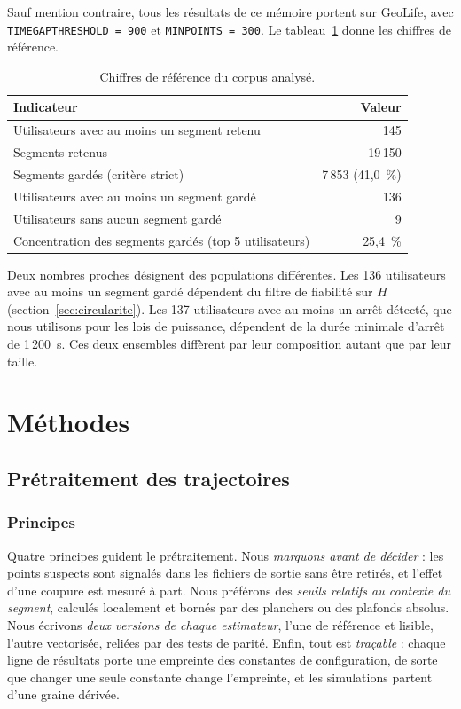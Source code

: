 \documentclass[11pt,a4paper]{article}
\newcommand{\code}[1]{\texttt{#1}}
\renewcommand{\_}{\textunderscore\penalty0\hspace{0pt}}
\begin{document}
Sauf mention contraire, tous les résultats de ce mémoire portent sur GeoLife, avec
\code{TIME\_GAP\_THRESHOLD = 900} et \code{MIN\_POINTS = 300}. Le
tableau~\ref{tab:corpus} donne les chiffres de référence.

\begin{table}[ht]
\centering
\caption{Chiffres de référence du corpus analysé.}
\label{tab:corpus}
\small
\begin{tabular}{lr}
\toprule
Indicateur & Valeur \\
\midrule
Utilisateurs avec au moins un segment retenu & 145 \\
Segments retenus & 19\,150 \\
Segments gardés (critère strict) & 7\,853 (41,0~\%) \\
Utilisateurs avec au moins un segment gardé & 136 \\
Utilisateurs sans aucun segment gardé & 9 \\
Concentration des segments gardés (top 5 utilisateurs) & 25,4~\% \\
\bottomrule
\end{tabular}
\end{table}

Deux nombres proches désignent des populations différentes. Les 136 utilisateurs avec au
moins un segment gardé dépendent du filtre de fiabilité sur $H$
(section~\ref{sec:circularite}). Les 137 utilisateurs avec au moins un arrêt détecté, que
nous utilisons pour les lois de puissance, dépendent de la durée minimale d'arrêt de
1\,200~s. Ces deux ensembles diffèrent par leur composition autant que par leur taille.

\section{Méthodes}
\label{sec:methodes}

\subsection{Prétraitement des trajectoires}
\label{sec:prep}

\subsubsection{Principes}

Quatre principes guident le prétraitement. Nous \emph{marquons avant de décider} : les
points suspects sont signalés dans les fichiers de sortie sans être retirés, et l'effet
d'une coupure est mesuré à part. Nous préférons des \emph{seuils relatifs au contexte du
segment}, calculés localement et bornés par des planchers ou des plafonds absolus. Nous
écrivons \emph{deux versions de chaque estimateur}, l'une de référence et lisible, l'autre
vectorisée, reliées par des tests de parité. Enfin, tout est \emph{traçable} : chaque ligne
de résultats porte une empreinte des constantes de configuration, de sorte que changer une
seule constante change l'empreinte, et les simulations partent d'une graine dérivée.
\end{document}
